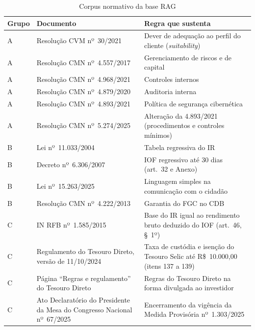 \begin{table}[htb]
  \caption{Corpus normativo da base RAG}
  \label{tab:corpus-normativo}
  \centering
  \small
  \begin{tabular}{p{1.2cm}p{6.2cm}p{6.6cm}}
    \toprule
    \textbf{Grupo} & \textbf{Documento} & \textbf{Regra que sustenta} \\
    \midrule
    A & Resolução CVM nº~30/2021 & Dever de adequação ao perfil do cliente (\textit{suitability}) \\
    A & Resolução CMN nº~4.557/2017 & Gerenciamento de riscos e de capital \\
    A & Resolução CMN nº~4.968/2021 & Controles internos \\
    A & Resolução CMN nº~4.879/2020 & Auditoria interna \\
    A & Resolução CMN nº~4.893/2021 & Política de segurança cibernética \\
    A & Resolução CMN nº~5.274/2025 & Alteração da 4.893/2021 (procedimentos e controles mínimos) \\
    B & Lei nº~11.033/2004 & Tabela regressiva do IR \\
    B & Decreto nº~6.306/2007 & IOF regressivo até 30 dias (art.~32 e Anexo) \\
    B & Lei nº~15.263/2025 & Linguagem simples na comunicação com o cidadão \\
    B & Resolução CMN nº~4.222/2013 & Garantia do FGC no CDB \\
    C & IN RFB nº~1.585/2015 & Base do IR igual ao rendimento bruto deduzido do IOF (art.~46, §~1º) \\
    C & Regulamento do Tesouro Direto, versão de 11/10/2024 & Taxa de custódia e isenção do Tesouro Selic até R\$~10.000,00 (itens 137 a 139) \\
    C & Página ``Regras e regulamento'' do Tesouro Direto & Regras do Tesouro Direto na forma divulgada ao investidor \\
    C & Ato Declaratório do Presidente da Mesa do Congresso Nacional nº~67/2025 & Encerramento da vigência da Medida Provisória nº~1.303/2025 \\
    \bottomrule
  \end{tabular}
\end{table}
